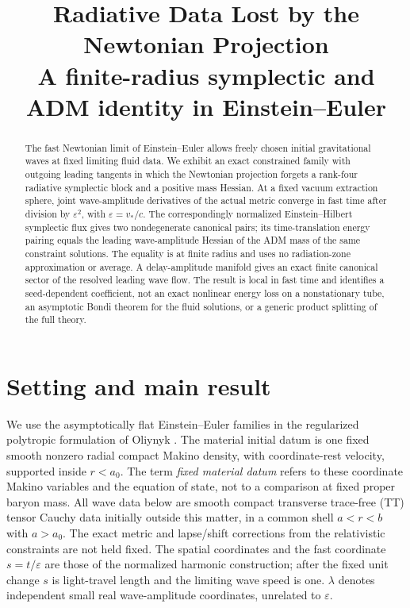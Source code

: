 \documentclass[11pt]{article}
\title{Radiative Data Lost by the Newtonian Projection\\
\large A finite-radius symplectic and ADM identity in Einstein--Euler}
\author{}
\date{}
\theoremstyle{remark}
\newcommand{\eps}{\varepsilon}
\begin{document}
\maketitle
\begin{abstract}
The fast Newtonian limit of Einstein--Euler allows freely chosen initial gravitational waves at fixed limiting fluid data. We exhibit an exact constrained family with outgoing leading tangents in which the Newtonian projection forgets a rank-four radiative symplectic block and a positive mass Hessian. At a fixed vacuum extraction sphere, joint wave-amplitude derivatives of the actual metric converge in fast time after division by \(\varepsilon^2\), with \(\varepsilon=v_*/c\). The correspondingly normalized Einstein--Hilbert symplectic flux gives two nondegenerate canonical pairs; its time-translation energy pairing equals the leading wave-amplitude Hessian of the ADM mass of the same constraint solutions. The equality is at finite radius and uses no radiation-zone approximation or average. A delay-amplitude manifold gives an exact finite canonical sector of the resolved leading wave flow. The result is local in fast time and identifies a seed-dependent coefficient, not an exact nonlinear energy loss on a nonstationary tube, an asymptotic Bondi theorem for the fluid solutions, or a generic product splitting of the full theory.
\end{abstract}

\section{Setting and main result}

We use the asymptotically flat Einstein--Euler families in the regularized polytropic formulation of Oliynyk \cite{Oliynyk}. The material initial datum is one fixed smooth nonzero radial compact Makino density, with coordinate-rest velocity, supported inside \(r<a_0\). The term \emph{fixed material datum} refers to these coordinate Makino variables and the equation of state, not to a comparison at fixed proper baryon mass. All wave data below are smooth compact transverse trace-free (TT) tensor Cauchy data initially outside this matter, in a common shell \(a<r<b\) with \(a>a_0\). The exact metric and lapse/shift corrections from the relativistic constraints are not held fixed. The spatial coordinates and the fast coordinate \(s=t/\eps\) are those of the normalized harmonic construction; after the fixed unit change \(s\) is light-travel length and the limiting wave speed is one. \(\lambda\) denotes independent small real wave-amplitude coordinates, unrelated to \(\eps\).
\end{document}
